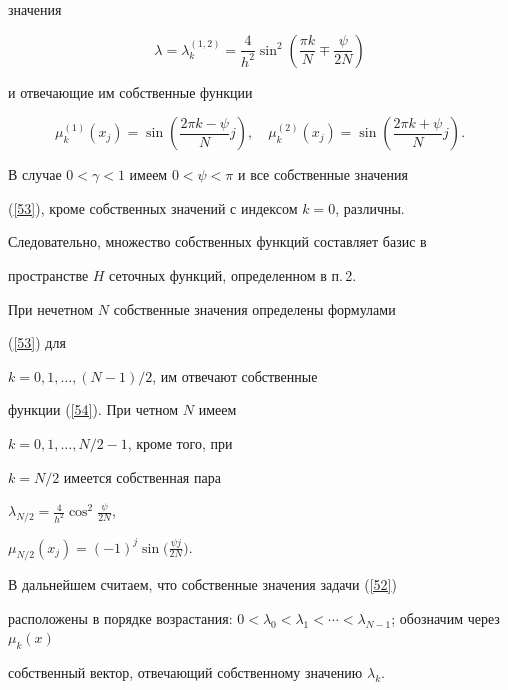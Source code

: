 значения


\begin{equation}\label{53}


\lambda=\lambda_k^{(1,2)}=\frac{4}{{h^2}}\sin ^2 \left(


{\frac{{\pi k}}{N} \mp \frac{\psi}{{2N}}} \right)


\end{equation}


и отвечающие им собственные функции


\begin{equation}\label{54}


\mu_k^{(1)}(x_{j})=\sin \left({\frac{{2\pi k-\psi}}{N}j}


\right),\quad \mu_k^{(2)}(x_{j})=\sin \left({\frac{{2\pi k+


\psi}}{N}j} \right).


\end{equation}





В случае $0<\gamma <1$ имеем $0<\psi <\pi$ и все собственные значения


(\ref{53}), кроме собственных значений с индексом $k=0$, различны.


Следовательно, множество собственных функций составляет базис в 


пространстве $H$ сеточных функций, определенном в п.\,2.


При нечетном $N$ собственные значения определены формулами


(\ref{53}) для


$k=0,1,\dotsc,(N-1)/2$, им отвечают собственные


функции (\ref{54}). При четном $ N$ имеем


$ k=0,1,\dotsc,N/2-1$, кроме того, при


$ k=N/2$ имеется собственная пара


$\lambda_{N/2}=\frac{4}{{h^2}}\cos ^2 \frac{\psi}{{2N}}$,


$\mu_{N/2}(x_{j})=(- 1)^j \sin \big({\frac{{\psi j}}{{2N}}}\big)$.





В дальнейшем считаем, что собственные значения задачи (\ref{52})


расположены в порядке возрастания: $0 < \lambda_0 < \lambda_1 <


\dotsb < \lambda_{N-1}$; обозначим через $\mu_k (x)$


собственный вектор, отвечающий собственному значению $\lambda_k$.


